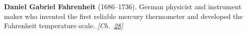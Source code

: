 \textbf{Daniel Gabriel Fahrenheit} (1686–1736). German physicist and instrument maker who invented the first reliable mercury thermometer and developed the Fahrenheit temperature scale. \emph{[Ch.~\hyperref[ch:negativetemperature]{28}]}

